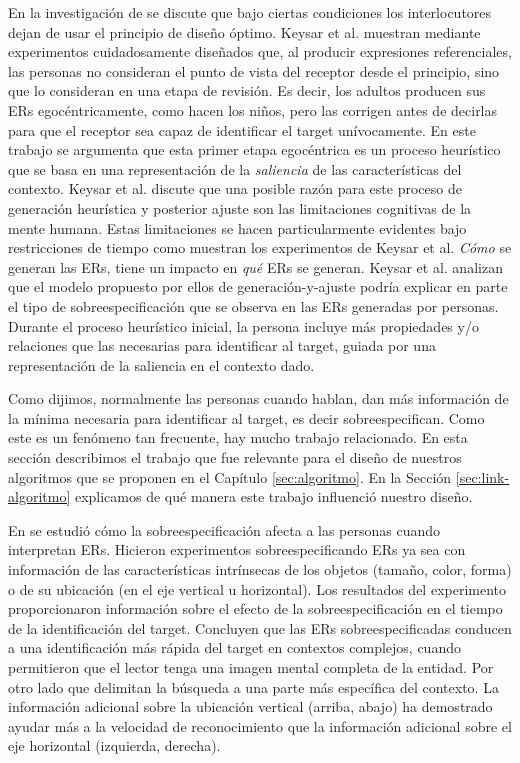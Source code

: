 En la investigaci\'on de \cite{keysar:Curr98} se discute que bajo ciertas condiciones los interlocutores dejan de usar el principio de dise\~no \'optimo. Keysar et al. muestran mediante experimentos cuidadosamente dise\~nados que, al producir expresiones referenciales, las personas no consideran el punto de vista del receptor desde el principio, sino que lo consideran en una etapa de revisi\'on. Es decir, los adultos producen sus ERs egoc\'entricamente, como hacen los ni\~nos, pero las corrigen antes de decirlas para que el receptor sea capaz de identificar el target un\'ivocamente. En este trabajo se argumenta que esta primer etapa egoc\'entrica es un proceso heur\'istico que se basa en una representaci\'on de la \emph{saliencia} de las caracter\'isticas del contexto. Keysar et al. discute que una posible raz\'on para este proceso de generaci\'on heur\'istica y posterior ajuste son las limitaciones cognitivas de la mente humana. Estas limitaciones se hacen particularmente evidentes bajo restricciones de tiempo como muestran los experimentos de Keysar et al.
\emph{C\'omo} se generan las ERs, tiene un impacto en \emph{qu\'e} ERs se generan. Keysar et al. analizan que el modelo propuesto por ellos de generaci\'on-y-ajuste podr\'ia explicar en parte el tipo de sobreespecificaci\'on que se observa en las ERs generadas por personas. Durante el proceso heur\'istico inicial, la persona incluye m\'as propiedades y/o relaciones que las necesarias para identificar al target, guiada por una representaci\'on de la saliencia en el contexto dado.

Como dijimos, normalmente las personas cuando hablan, dan m\'as informaci\'on de la m\'inima necesaria para identificar al target, es decir sobreespecifican. Como este es un fen\'omeno tan frecuente, hay mucho trabajo relacionado. En esta secci\'on describimos el trabajo que fue relevante para el dise\~no de nuestros algoritmos que se proponen en el Cap\'itulo \ref{sec:algoritmo}. En la Secci\'on \ref{sec:link-algoritmo} explicamos de qu\'e manera este trabajo influenci\'o nuestro dise\~no.

En \cite{arts} se estudi\'o c\'omo la sobreespecificaci\'on afecta a las personas cuando interpretan ERs. Hicieron experimentos sobreespecificando ERs ya sea con informaci\'on de las caracter\'isticas intr\'insecas de los objetos (tama\~no, color, forma) o de su ubicaci\'on (en el eje vertical u horizontal). Los resultados del experimento
proporcionaron informaci\'on sobre el efecto de la sobreespecificaci\'on en el tiempo de la identificaci\'on del target.
Concluyen que las ERs sobreespecificadas conducen a una identificaci\'on m\'as r\'apida del target en contextos complejos, cuando permitieron que el lector 
tenga una imagen mental completa de la entidad. Por otro lado que delimitan la b\'usqueda a una parte m\'as espec\'ifica
del contexto. La informaci\'on adicional sobre la ubicaci\'on vertical (arriba, abajo) ha demostrado ayudar m\'as a la velocidad de reconocimiento que la informaci\'on adicional sobre el eje horizontal (izquierda, derecha).

